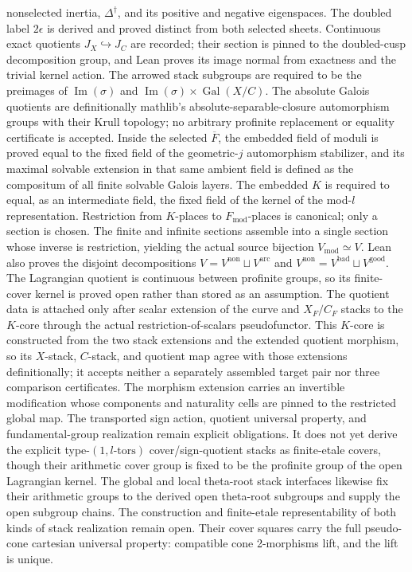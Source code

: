 \documentclass[11pt]{article}
\theoremstyle{plain}
\theoremstyle{definition}
\theoremstyle{remark}
\begin{document}
nonselected inertia, \(\Delta^\dagger\), and its positive and negative
eigenspaces.  The doubled label \(2\epsilon\) is derived and proved distinct
from both selected sheets.  Continuous exact quotients
\(J_X\hookrightarrow J_C\) are recorded; their section is pinned to the
doubled-cusp decomposition group, and Lean proves its image normal from
exactness and the trivial kernel action.  The arrowed stack subgroups are
required to be the preimages of \(\operatorname{Im}(\sigma)\) and
\(\operatorname{Im}(\sigma)\times\operatorname{Gal}(X/C)\).  The absolute Galois quotients are definitionally
mathlib's absolute-separable-closure automorphism groups with their Krull topology;
no arbitrary profinite replacement or equality certificate is accepted.
Inside the selected \(\overline F\), the embedded field of moduli is proved
equal to the fixed field of the geometric-\(j\) automorphism stabilizer, and
its maximal solvable extension in that same ambient field is defined as the
compositum of all finite solvable Galois layers.  The embedded
\(K\) is required to equal, as an intermediate field, the fixed field of the
kernel of the mod-\(l\) representation.  Restriction from \(K\)-places to
\(F_{\mathrm{mod}}\)-places is canonical; only a section is chosen.  The finite
and infinite sections assemble into a single section whose inverse is
restriction, yielding the actual source bijection
\(V_{\mathrm{mod}}\simeq V\).  Lean also proves the disjoint decompositions
\(V=V^{\mathrm{non}}\sqcup V^{\mathrm{arc}}\) and
\(V^{\mathrm{non}}=V^{\mathrm{bad}}\sqcup V^{\mathrm{good}}\).
The Lagrangian quotient is
continuous between profinite groups, so its finite-cover kernel is proved
open rather than stored as an assumption.  The quotient data is attached only
after scalar extension of the curve and \(X_F/C_F\) stacks to the \(K\)-core
through the actual restriction-of-scalars pseudofunctor.  This \(K\)-core is
constructed from the two stack extensions and the extended quotient morphism,
so its \(X\)-stack, \(C\)-stack, and quotient map agree with those extensions
definitionally; it accepts neither a separately assembled target pair nor
three comparison certificates.  The morphism extension carries an invertible
modification whose components and naturality cells are pinned to the restricted
global map.  The transported sign action, quotient universal property, and
fundamental-group realization remain explicit obligations.  It does not yet
derive the explicit type-\((1,l\text{-tors})\) cover/sign-quotient stacks as
finite-etale covers, though their arithmetic cover group is fixed to be the
profinite group of the open Lagrangian kernel.  The global and local
theta-root stack interfaces likewise fix their arithmetic groups to the
derived open theta-root subgroups and supply the open subgroup chains.  The construction and
finite-etale representability of both kinds of stack realization remain open.
Their cover squares carry
the full pseudo-cone cartesian universal property: compatible cone
2-morphisms lift, and the lift is unique.
\end{document}

